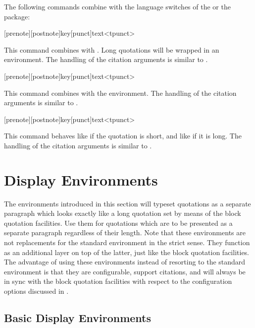 \documentclass{ltxdockit}[2010/09/26]
\begin{document}
The following commands combine  with the language switches of the  or the  package:

\begin{ltxsyntax}

[prenote][postnote]{key}[punct]{text}<tpunct>

This command combines  with . Long quotations will be wrapped in an  environment. The handling of the citation arguments is similar to .

[prenote][postnote]{key}[punct]{text}<tpunct>

This command combines  with the  environment. The handling of the citation arguments is similar to .

[prenote][postnote]{key}[punct]{text}<tpunct>

This command behaves like  if the quotation is short, and like  if it is long. The handling of the citation arguments is similar to .

\end{ltxsyntax}

\section{Display Environments}
\label{env}

The environments introduced in this section will typeset quotations as a separate paragraph which looks exactly like a long quotation set by means of the block quotation facilities. Use them for quotations which are to be presented as a separate paragraph regardless of their length. Note that these environments are not replacements for the standard  environment in the strict sense. They function as an additional layer on top of the latter, just like the block quotation facilities. The advantage of using these environments instead of resorting to the standard  environment is that they are configurable, support citations, and will always be in sync with the block quotation facilities with respect to the configuration options discussed in .

\subsection{Basic Display Environments}
\label{env:bas}
\end{document}
